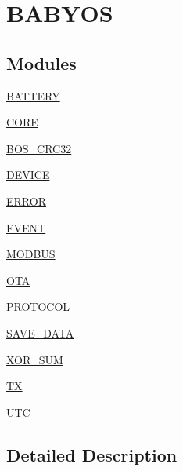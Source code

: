 \hypertarget{group___b_a_b_y_o_s}{}\section{B\+A\+B\+Y\+OS}
\label{group___b_a_b_y_o_s}
\subsection*{Modules}
\begin{DoxyCompactItemize}
\item 
\mbox{\hyperlink{group___b_a_t_t_e_r_y}{B\+A\+T\+T\+E\+RY}}
\item 
\mbox{\hyperlink{group___c_o_r_e}{C\+O\+RE}}
\item 
\mbox{\hyperlink{group___b_o_s___c_r_c32}{B\+O\+S\+\_\+\+C\+R\+C32}}
\item 
\mbox{\hyperlink{group___d_e_v_i_c_e}{D\+E\+V\+I\+CE}}
\item 
\mbox{\hyperlink{group___e_r_r_o_r}{E\+R\+R\+OR}}
\item 
\mbox{\hyperlink{group___e_v_e_n_t}{E\+V\+E\+NT}}
\item 
\mbox{\hyperlink{group___m_o_d_b_u_s}{M\+O\+D\+B\+US}}
\item 
\mbox{\hyperlink{group___o_t_a}{O\+TA}}
\item 
\mbox{\hyperlink{group___p_r_o_t_o_c_o_l}{P\+R\+O\+T\+O\+C\+OL}}
\item 
\mbox{\hyperlink{group___s_a_v_e___d_a_t_a}{S\+A\+V\+E\+\_\+\+D\+A\+TA}}
\item 
\mbox{\hyperlink{group___x_o_r___s_u_m}{X\+O\+R\+\_\+\+S\+UM}}
\item 
\mbox{\hyperlink{group___t_x}{TX}}
\item 
\mbox{\hyperlink{group___u_t_c}{U\+TC}}
\end{DoxyCompactItemize}


\subsection{Detailed Description}
